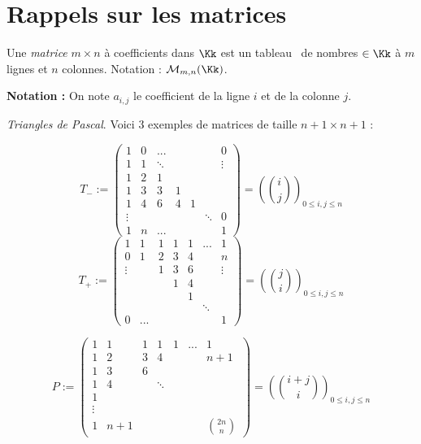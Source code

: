 \documentclass[class=report,crop=false]{standalone}
\begin{document}
\chapter{Rappels sur les matrices}

\begin{definition}
Une {\it matrice} $m \times n$ à coefficients dans $\Kk$ est un \og tableau \fg\ de nombres $\in \Kk$  à $m$ lignes et $n$ colonnes. Notation : $\mathcal{M}_{m,n}(\Kk)$.
\end{definition}

{\bf Notation :} On note $a_{i,j}$ le coefficient de la ligne $i$ et de la colonne $j$.

\begin{exemple}
{\it Triangles de Pascal}. Voici $3$ exemples de matrices de taille $n+1 \times n+1$ :

\[T_- := \left(\begin{array}{ccccccc}
1&0&...&&&&0\\
1 & 1 &\ddots&&&&\vdots\\
1 & 2 & 1&&&&\\
1&3 & 3 &  1&&&\\
1 & 4 & 6 & 4 & 1 &&\\
\vdots &&&&&\ddots&0\\
1 & n & ... & & &&1
\end{array}\right) = \left({i \choose j}\right)_{0 \le i,j \le n}\]
\[T_+:= \left(\begin{array}{ccccccc}
1&1&1&1&1&...&1\\
0&1 & 2 &3 &4&&n\\
\vdots & &1 & 3&6&&\vdots\\
& & &1 &4 &&\\
&&&&1&&\\
&&&&&\ddots&\\
0 &...&&&&&1
\end{array}\right) = \left({j \choose i}\right)_{0 \le i,j \le n}\]

\[P:= \left(\begin{array}{ccccccc}
1 & 1 &1 & 1 &1 & ... & 1\\
1 & 2 & 3 & 4 &&&n+1\\
1&3 & 6&&&&\\
1 & 4 &&\ddots &&&\\
1 &&&&&&\\
\vdots&&&&&&\\
1 & n+1 &&&&& 2n \choose n
\end{array}\right) = \left({ i+j \choose i} \right)_{0 \le i,j \le n}\]
\end{exemple}
\end{document}
